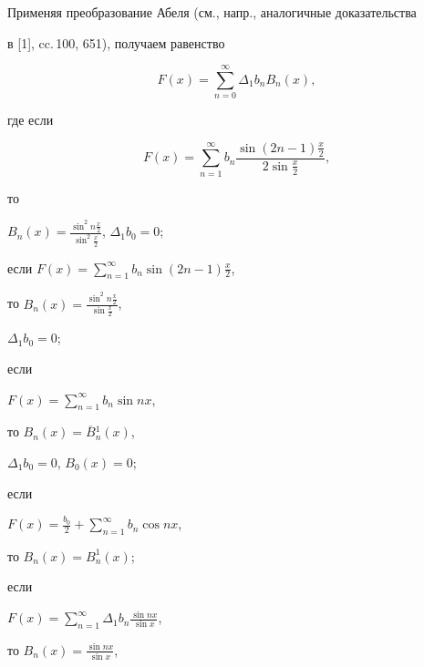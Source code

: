 \begin{pf}


Применяя преобразование Абеля (см., напр., аналогичные доказательства


в [1], cc.\,100, 651), получаем равенство


\begin{equation}


F(x) =\sum\limits_{n=0}^{\infty} \Delta _1 b_n B_n(x),


\end{equation}


где если


\begin{equation}


F(x)=\sum\limits_{n=1}^{\infty}


b_n \frac{\sin(2n-1)\frac{x}{2}}


{2\sin{\frac{x}{2}}},


\end{equation}


то


$ B_n(x)=\frac{\sin^2n{\frac{x}{2}}}


{\sin^2{\frac{x}{2}}}$, $\Delta _1b_0=0$;





если $F(x)=\sum\limits_{n=1}^{\infty}


b_n \sin(2n-1)\frac{x}{2}$,


то $ B_n(x)=\frac{\sin^2n{\frac{x}{2}}}{\sin\frac{x}{2}}$,


$\Delta _1 b_0=0$;





если


$F(x)=\sum\limits_{n=1}^{\infty} b_n \sin nx$,


то $ B_n(x)= \overline{B}{}_n^1(x)$,


$\Delta _1 b_0=0$, $B_0(x)=0$;





если


$F(x)=\frac{b_0}{2}+\sum\limits_{n=1}^{\infty} b_n\cos nx$,


то $ B_n(x)=B_n^1(x)$;





если


$F(x)=\sum\limits_{n=1}^{\infty} \Delta _1 b_n \frac{\sin nx}{\sin x}$,


то $ B_n(x)=\frac{\sin nx}{\sin x}$,



\end{pf}
